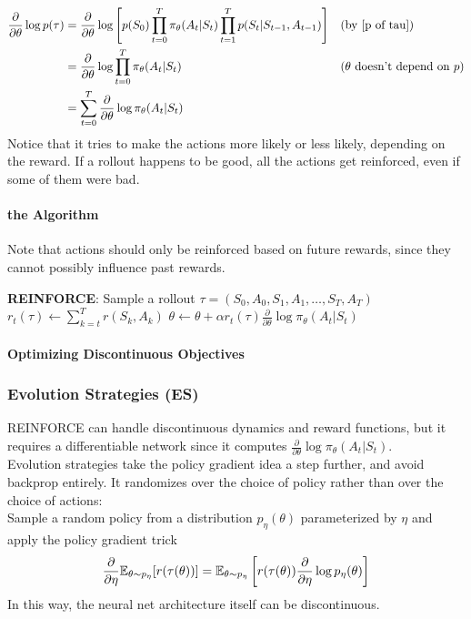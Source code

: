 \documentclass[11pt]{article}
\begin{document}
\begin{align}
	\frac{\partial}{\partial \theta} \log p(\tau) 
	&= \frac{\partial}{\partial \theta} \log \left [p(S_0)\prod_{t=0}^T\pi_\theta(A_t | S_t) \prod_{t=1}^Tp(S_t|S_{t-1},A_{t-1})\right] &&\text{(by \ref{p of tau})}\\
	&=\frac{\partial}{\partial \theta} \log \prod_{t=0}^T\pi_\theta(A_t | S_t) &&\text{($\theta$ doesn't depend on $p$)}\\
	&= \sum_{t=0}^T \frac{\partial }{\partial \theta} \log \pi_\theta(A_t|S_t)
\end{align}
Notice that it tries to make  the actions more likely or less likely, depending on the reward. If a rollout happens to be good, all the actions get reinforced, even if some of them were bad.

\paragraph{the Algorithm}
Note that actions should only be reinforced based on future rewards, since they cannot possibly influence past rewards.
\begin{algorithm}[H]
\begin{algorithmic}
\State {} \textbf{REINFORCE}:
\State Sample a rollout $\tau = (S_0, A_0, S_1, A_1, \hdots, S_T, A_T)$
\State $r_t(\tau) \gets \sum_{k=t}^Tr(S_k,A_k)$
\State$ \theta \gets \theta + \alpha r_t(\tau)\frac{\partial }{\partial \theta} \log \pi_\theta(A_t|S_t)$
\EndFor
\EndWhile
\end{algorithmic}
\end{algorithm}

\paragraph{Optimizing Discontinuous Objectives}

\subsubsection{Evolution Strategies (ES)}
REINFORCE can handle discontinuous dynamics and reward functions, but it requires a differentiable network since it computes $\frac{\partial }{\partial \theta} \log \pi_\theta(A_t|S_t)$.\\
Evolution strategies take the policy gradient idea a step further, and avoid backprop entirely. It randomizes over the choice of policy rather than over the choice of actions:\\
Sample a random policy from a distribution $p_\eta(\theta)$ parameterized by $\eta$ and apply  the policy gradient trick
$$\frac{\partial }{\partial \eta} \mathbb{E}_{\theta \sim p_\eta}[r(\tau(\theta))] = \mathbb{E}_{\theta \sim p_\eta}\left[ r(\tau(\theta))\frac{\partial }{\partial \eta} \log p_\eta(\theta) \right]$$
In this way, the neural net architecture itself can be discontinuous.
\end{document}
